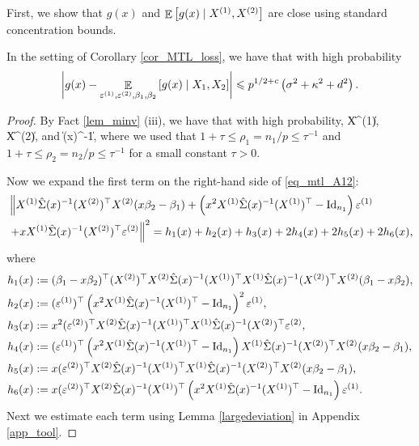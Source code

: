 First, we show that $g(x)$ and $\mathop{\mathbb{E}}\left[ g(x) \mid X^{(1)}, X^{(2)} \right]$ are close using standard concentration bounds.
\begin{claim}\label{claim_largedev1}
 In the setting of Corollary \ref{cor_MTL_loss}, we have that with high probability
$$\left| g(x) - \mathop{\mathbb{E}}_{\varepsilon^{(1)}, \varepsilon^{(2)} ,\beta_1,\beta_2}\left[ g(x) \mid X_1, X_2  \right]\right| \leqslant p^{1/2+c} \left(\sigma^2 + \kappa^2+d^2 \right).$$
 \end{claim}
 \begin{proof}
By Fact \ref{lem_minv} (iii), we have that with high probability,
 \be\label{op_X12}
\|X^{(1)}\|\le {}\lesssim {}, \quad \|X^{(2)}\|\le {}\lesssim {},
 \ee
 and
 \be\label{op_Sig1}
\| \hat\Sigma(x)^{-1}\|\le {}\lesssim {},
 \ee
where we used that $1+\tau\le \rho_1=n_1/p\le \tau^{-1}$ and $1+\tau\le \rho_2=n_2/p\le \tau^{-1}$ for a small constant $\tau>0$.

 Now we expand the first term on the right-hand side of \eqref{eq_mtl_A12}:
 \begin{align}
 & \left\| X^{(1)} \hat\Sigma(x)^{-1} (X^{(2)})^\top X^{(2)} (x\beta_2-\beta_1)+ \left(x^2 X^{(1)}\hat \Sigma(x)^{-1} (X^{(1)})^\top-\operatorname{Id}_{n_1}\right)\varepsilon^{(1)} \right. \nonumber\\
		& \left. + x X^{(1)}\hat \Sigma(x)^{-1} (X^{(2)})^\top \varepsilon^{(2)} \right\|^2=h_1(x) + h_2(x) +h_3(x) + 2h_4(x) + 2h_5(x) + 2h_6(x) ,\label{expand_6}
 \end{align}
 where
 \begin{align*}
&h_1(x):=  (\beta_1-x\beta_2)^\top (X^{(2)})^\top X^{(2)}  \hat\Sigma(x)^{-1}  (X^{(1)})^\top X^{(1)} \hat\Sigma(x)^{-1} (X^{(2)})^\top X^{(2)} (\beta_1-x\beta_2)  ,\\
& h_2(x) := {(\varepsilon^{(1)})^\top \left(x^2 X^{(1)}\hat\Sigma(x)^{-1} (X^{(1)})^\top-\operatorname{Id}_{n_1}\right)^2\varepsilon^{(1)}}  ,\\
& h_3(x):=  x^2 { (\varepsilon^{(2)} )^\top X^{(2)} \hat\Sigma(x)^{-1}  (X^{(1)})^\top X^{(1)}\hat\Sigma(x)^{-1} (X^{(2)})^\top \varepsilon^{(2)}} , \\
& h_4(x):=  (\varepsilon^{(1)})^\top\left(x^2 X^{(1)}\hat\Sigma(x)^{-1} (X^{(1)})^\top-\operatorname{Id}_{n_1}\right) X^{(1)} \hat\Sigma(x)^{-1} (X^{(2)})^\top X^{(2)} (x\beta_2-\beta_1), \\
&h_5(x):=x (\varepsilon^{(2)})^\top X^{(2)}\hat\Sigma(x)^{-1} (X^{(1)})^\top X^{(1)} \hat\Sigma(x)^{-1} (X^{(2)})^\top X^{(2)} (x\beta_2-\beta_1),\\
&h_6(x):=x (\varepsilon^{(2)})^\top X^{(2)}\hat\Sigma(x)^{-1} (X^{(1)})^\top\left(x^2 X^{(1)}\hat\Sigma(x)^{-1} (X^{(1)})^\top-\operatorname{Id}_{n_1}\right)\varepsilon^{(1)}.
\end{align*}
Next we estimate each term using Lemma \ref{largedeviation} in Appendix \ref{app_tool}.


\end{proof}

